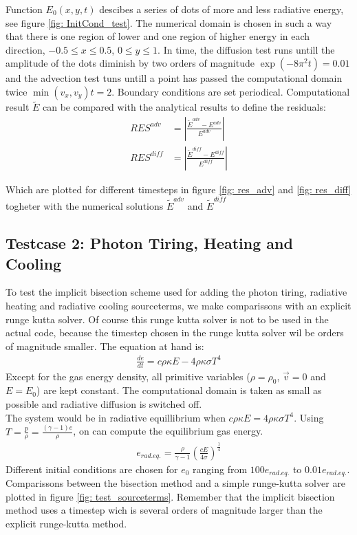 Function $E_0(x,y,t)$ descibes a series of dots of more and less radiative energy, see figure \ref{fig: InitCond_test}. The numerical domain is chosen in such a way that there is one region of lower and one region of higher energy in each direction, $-0.5 \leq x \leq 0.5$, $0 \leq y \leq 1$. In time, the diffusion test runs untill the amplitude of the dots diminish by two orders of magnitude $\exp(-8 \pi^2 t)  = 0.01$ and the advection test tuns untill a point has passed the computational domain twice $ \min(v_x, v_y) t = 2 $. Boundary conditions are set periodical. Computational result $\tilde{E}$ can be compared with the analytical results to define the residuals:
\begin{align}
RES^{adv} &= \left|\frac{\tilde{E}^{adv} - E^{adv}}{E^{adv}}\right| \\
RES^{diff} &= \left|\frac{\tilde{E}^{diff} - E^{diff}}{E^{diff}}\right| 
\end{align}

Which are plotted for different timesteps in figure \ref{fig: res_adv} and \ref{fig: res_diff} togheter with the numerical solutions $\tilde{E}^{adv}$ and $\tilde{E}^{diff}$

\subsection{Testcase 2: Photon Tiring, Heating and Cooling}
To test the implicit bisection scheme used for adding the photon tiring, radiative heating and radiative cooling sourceterms, we make comparissons with an explicit runge kutta solver. Of course this runge kutta solver is not to be used in the actual code, because the timestep chosen in the runge kutta solver wil be orders of magnitude smaller. The equation at hand is:
\begin{align}
\frac{d e}{dt} = c \rho \kappa E - 4 \rho \kappa \sigma T^4
\end{align}
Except for the gas energy density, all primitive variables ($\rho = \rho_0$, $\vec{v} = 0$ and $E = E_0$) are kept constant. The computational domain is taken as small as possible and radiative diffusion is switched off. \\

The system would be in radiative equillibrium when $c \rho \kappa E = 4 \rho \kappa \sigma T^4$. Using $T =  \frac{p}{\rho}= \frac{(\gamma - 1)e}{\rho}$, on can compute the equilibrium gas energy.
\begin{align}
e_{rad. eq.} = \frac{\rho}{\gamma - 1} \left( \frac{c E}{4 \sigma} \right)^\frac{1}{4}
\end{align}
Different initial conditions are chosen for $e_0$ ranging from $100 e_{rad. eq.}$ to $0.01 e_{rad. eq.}$. Comparissons between the bisection method and a simple runge-kutta solver are plotted in figure \ref{fig: test_sourceterms}. Remember that the implicit bisection method uses a timestep wich is several orders of magnitude larger than the explicit runge-kutta method.

